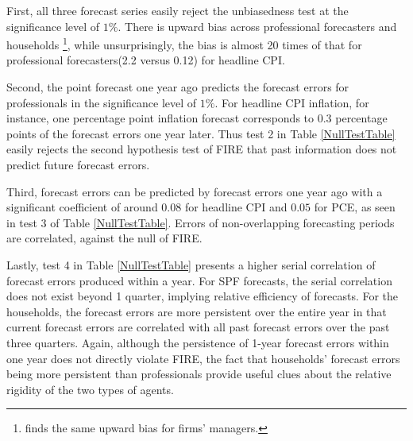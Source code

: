 \documentclass[12pt]{article}
\begin{document}
	First,  all three forecast series easily reject the unbiasedness test at the significance level of $1\%$. There is upward bias across professional forecasters and households \footnote{\citet{coibion2018firms} finds the same upward bias for firms' managers.}, while unsurprisingly, the bias is almost 20 times of that for professional forecasters(2.2 versus 0.12) for headline CPI. 
	
	Second, the point forecast one year ago predicts the forecast errors for professionals in the significance level of $1\%$. For headline CPI inflation, for instance, one percentage point inflation forecast corresponds to 0.3 percentage points of the forecast errors one year later. Thus test 2 in Table \ref{NullTestTable} easily rejects the second hypothesis test of FIRE that past information does not predict future forecast errors. 
	
	Third, forecast errors can be predicted by forecast errors one year ago with a significant coefficient of around $0.08$ for headline CPI and $0.05$ for PCE, as seen in test 3 of Table \ref{NullTestTable}. Errors of non-overlapping forecasting periods are correlated, against the null of FIRE. 
	
	Lastly, test 4 in Table \ref{NullTestTable} presents a higher serial correlation of forecast errors produced within a year. For SPF forecasts, the serial correlation does not exist beyond 1 quarter, implying relative efficiency of forecasts. For the households, the forecast errors are more persistent over the entire year in that current forecast errors are correlated with all past forecast errors over the past three quarters.  Again, although the persistence of 1-year forecast errors within one year does not directly violate FIRE, the fact that households' forecast errors being more persistent than professionals provide useful clues about the relative rigidity of the two types of agents. 
	
\end{document}
